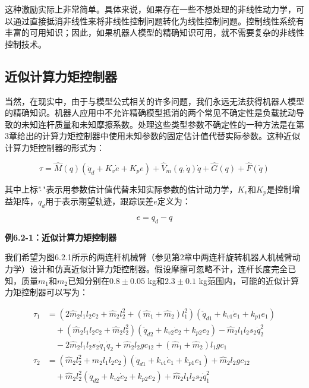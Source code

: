 \documentclass[12pt,a4paper]{ctexart}
\begin{document}
这种激励实际上非常简单。具体来说，如果存在一些不想处理的非线性动力学，可以通过直接抵消非线性来将非线性控制问题转化为线性控制问题。控制线性系统有丰富的可用知识；因此，如果机器人模型的精确知识可用，就不需要复杂的非线性控制技术。

\subsection*{近似计算力矩控制器}

当然，在现实中，由于与模型公式相关的许多问题，我们永远无法获得机器人模型的精确知识。机器人应用中不允许精确模型抵消的两个常见不确定性是负载扰动导致的未知连杆质量和未知摩擦系数。处理这些类型参数不确定性的一种方法是在第3章给出的计算力矩控制器中使用未知参数的固定估计值代替实际参数。这种近似计算力矩控制器的形式为：

\begin{equation}\label{eq:6.2.2}
\tau = \hat{M}(q)(\ddot{q}_d + K_v \dot{e} + K_p e) + \hat{V}_m(q, \dot{q})\dot{q} + \hat{G}(q) + \hat{F}(\dot{q})
\end{equation}

其中上标"$\hat{\ }$"表示用参数估计值代替未知实际参数的估计动力学，$K_v$和$K_p$是控制增益矩阵，$q_d$用于表示期望轨迹，跟踪误差$e$定义为：

\begin{equation*}
e = q_d - q
\end{equation*}

\textbf{例6.2-1：近似计算力矩控制器}

我们希望为图6.2.1所示的两连杆机械臂（参见第2章中两连杆旋转机器人机械臂动力学）设计和仿真近似计算力矩控制器。假设摩擦可忽略不计，连杆长度完全已知，质量$m_1$和$m_2$已知分别在$0.8 \pm 0.05$ kg和$2.3 \pm 0.1$ kg范围内，可能的近似计算力矩控制器可以写为：

\begin{align}
\tau_1 &= (2\hat{m}_2 l_1 l_2 c_2 + \hat{m}_2 l_2^2 + (\hat{m}_1 + \hat{m}_2)l_1^2)(\ddot{q}_{d1} + k_{v1}\dot{e}_1 + k_{p1}e_1) \nonumber\\
&\quad + (\hat{m}_2 l_1 l_2 c_2 + \hat{m}_2 l_2^2)(\ddot{q}_{d2} + k_{v2}\dot{e}_2 + k_{p2}e_2) - \hat{m}_2 l_1 l_2 s_2 \dot{q}_2^2 \nonumber\\
&\quad - 2\hat{m}_2 l_1 l_2 s_2 \dot{q}_1 \dot{q}_2 + \hat{m}_2 l_2 g c_{12} + (\hat{m}_1 + \hat{m}_2)l_1 g c_1 \nonumber\\
\tau_2 &= (\hat{m}_2 l_2^2 + \hat{m}_2 l_1 l_2 c_2)(\ddot{q}_{d1} + k_{v1}\dot{e}_1 + k_{p1}e_1) + \hat{m}_2 l_2 g c_{12} \nonumber\\
&\quad + \hat{m}_2 l_2^2 (\ddot{q}_{d2} + k_{v2}\dot{e}_2 + k_{p2}e_2) + \hat{m}_2 l_1 l_2 s_2 \dot{q}_1^2
\end{align}
\end{document}
